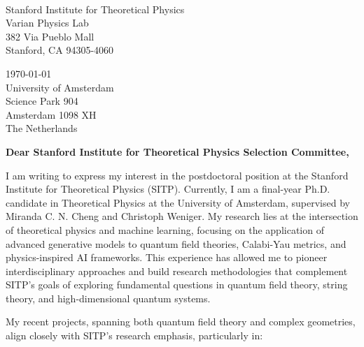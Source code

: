 \documentclass[11pt]{article}
\title{}
\author{}
\date{}
\begin{document}
\thispagestyle{firstpagestyle}

\noindent
\begin{minipage}[t]{0.5\textwidth}
\phantom{
\today \\
}
\vspace{0.2cm} \\
Stanford Institute for Theoretical Physics \\
Varian Physics Lab \\
382 Via Pueblo Mall \\
Stanford, CA 94305-4060

\end{minipage}
\begin{minipage}[t]{0.5\textwidth}
\flushright
\today \\
\vspace{0.2cm}
University of Amsterdam \\
Science Park 904 \\
Amsterdam 1098 XH \\
The Netherlands \\
\end{minipage}

\vspace{20pt}

\noindent
\textbf{Dear Stanford Institute for Theoretical Physics Selection Committee,}

I am writing to express my interest in the postdoctoral position at the Stanford Institute for Theoretical Physics (SITP). Currently, I am a final-year Ph.D. candidate in Theoretical Physics at the University of Amsterdam, supervised by Miranda C. N. Cheng and Christoph Weniger. My research lies at the intersection of theoretical physics and machine learning, focusing on the application of advanced generative models to quantum field theories, Calabi-Yau metrics, and physics-inspired AI frameworks. This experience has allowed me to pioneer interdisciplinary approaches and build research methodologies that complement SITP's goals of exploring fundamental questions in quantum field theory, string theory, and high-dimensional quantum systems.

My recent projects, spanning both quantum field theory and complex geometries, align closely with SITP's research emphasis, particularly in:
\end{document}
